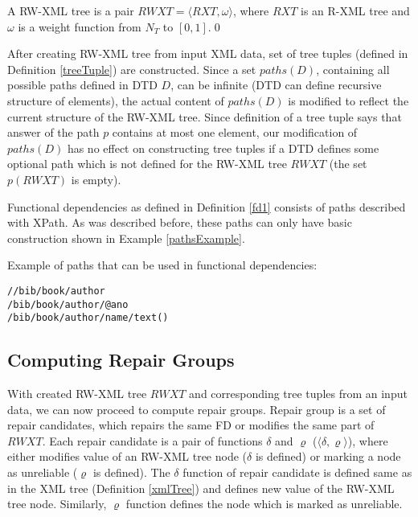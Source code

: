 \begin{define}
A RW-XML tree is a pair $RWXT = \langle RXT, \omega \rangle$, where $RXT$ is an R-XML tree and $\omega$ is a weight function from $N_T$ to $[0,1]$.\qed
\end{define}

After creating RW-XML tree from input XML data, set of tree tuples (defined in Definition \ref{treeTuple}) are constructed. Since a set $paths(D)$, containing all possible paths defined in DTD $D$, can be infinite (DTD can define recursive structure of elements), the actual content of $paths(D)$ is modified to reflect the current structure of the RW-XML tree. Since definition of a tree tuple says that answer of the path $p$ contains at most one element, our modification of $paths(D)$ has no effect on constructing tree tuples if a DTD defines some optional path which is not defined for the RW-XML tree $RWXT$ (the set $p(RWXT)$ is empty).

Functional dependencies as defined in Definition \ref{fd1} consists of paths described with XPath. As was described before, these paths can only have basic construction shown in Example \ref{pathsExample}.

\begin{example}\label{pathsExample}
Example of paths that can be used in functional dependencies:
\begin{verbatim}
//bib/book/author
/bib/book/author/@ano
/bib/book/author/name/text()
\end{verbatim}
\end{example}

\subsection{Computing Repair Groups}

With created RW-XML tree $RWXT$ and corresponding tree tuples from an input data, we can now proceed to compute repair groups. Repair group is a set of repair candidates, which repairs the same FD or modifies the same part of $RWXT$. Each repair candidate is a pair of functions $\delta$ and $\varrho$ ($\langle \delta, \varrho \rangle$), where either modifies value of an RW-XML tree node ($\delta$ is defined) or marking a node as unreliable ($\varrho$ is defined). The $\delta$ function of repair candidate is defined same as in the XML tree (Definition \ref{xmlTree}) and defines new value of the RW-XML tree node. Similarly, $\varrho$ function defines the node which is marked as unreliable.

